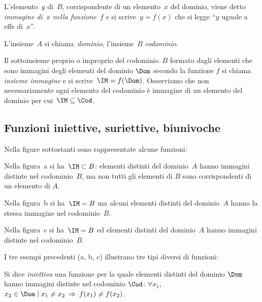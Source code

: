\begin{definizione}\label{def:immagine_di_f}
 L'elemento~$y$ di~$B$, corrispondente di un elemento~$x$ del dominio, viene detto \emph{immagine di~$x$ nella funzione~$f$} e
si scrive~$y = f(x)$ che si legge ``$y$ uguale a effe di~$x$''.
\end{definizione}

L'insieme~$A$ si chiama~\emph{dominio}, l'insieme~$B$ \emph{codominio}.

Il sottoinsieme proprio o improprio del codominio~$B$ formato dagli elementi che sono
immagini degli elementi del dominio $\Dom$ secondo la funzione $f$ si chiama
\emph{insieme immagine} e si scrive~$\IM = f(\Dom)$. Osserviamo che non necessariamente
ogni elemento del codominio è immagine di un elemento del dominio per cui~$\IM\subseteq \Cod$.

 \vspazio\ovalbox{\risolvii \ref{ese:\thechapter.1}, \ref{ese:\thechapter.2}, \ref{ese:\thechapter.3}}

\subsection{Funzioni iniettive, suriettive, biunivoche}

\begin{exrig}
 \begin{esempio}
Nella figure sottostanti sono rappresentate alcune funzioni:
\begin{center}
 
\end{center}

Nella figura~a si ha~$\IM\subset B$: elementi distinti del dominio~$A$ hanno immagini distinte nel codominio~$B$, ma non tutti gli elementi di $B$ sono corrispondenti di un elemento di $A$.

Nella figura~b si ha~$\IM=B$ ma alcuni elementi distinti del dominio~$A$ hanno la stessa immagine nel codominio~$B$.

Nella figura~c si ha~$\IM=B$ ed elementi distinti del dominio~$A$ hanno immagini distinte nel codominio~$B$.
 \end{esempio}
\end{exrig}

I tre esempi precedenti (a, b, c) illustrano tre tipi diversi di funzioni:

\begin{definizione}
Si dice \emph{iniettiva} una funzione per la quale elementi distinti del
dominio $\Dom$ hanno immagini distinte nel codominio $\Cod$: $\forall x_1$, $x_2 \in \Dom \mid  x_1\neq x_2 \:\Rightarrow\: f(x_1)\neq f(x_2)$.
\end{definizione}

